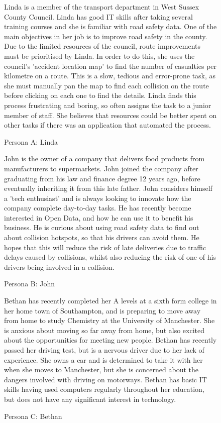 \documentclass[authoryearcitations]{UoYCSproject}
\begin{document}
\begin{figure}
	\begin{framed}
 		Linda is a member of the transport department in West Sussex County Council. Linda has good IT skills after taking several training courses and she is familiar with road safety data. One of the main objectives in her job is to improve road safety in the county. Due to the limited resources of the council, route improvements must be prioritised by Linda. In order to do this, she uses the council's 'accident location map' to find the number of casualties per kilometre on a route. This is a slow, tedious and error-prone task, as she must manually pan the map to find each collision on the route before clicking on each one to find the details. Linda finds this process frustrating and boring, so often assigns the task to a junior member of staff. She believes that resources could be better spent on other tasks if there was an application that automated the process.
  	\end{framed}
  \caption{Persona A: Linda}
  \label{fig:personaA}
\end{figure}

\begin{figure}
	\begin{framed}
 		John is the owner of a company that delivers food products from manufacturers to supermarkets. John joined the company after graduating from his law and finance degree 12 years ago, before eventually inheriting it from this late father. John considers himself a 'tech enthusiast' and is always looking to innovate how the company complete day-to-day tasks. He has recently become interested in Open Data, and how he can use it to benefit his business. He is curious about using road safety data to find out about collision hotspots, so that his drivers can avoid them. He hopes that this will reduce the risk of late deliveries due to traffic delays caused by collisions, whilst also reducing the risk of one of his drivers being involved in a collision. 	\end{framed}
  \caption{Persona B: John}
  \label{fig:personaB}
\end{figure}

\begin{figure}
	\begin{framed}
 		Bethan has recently completed her A levels at a sixth form college in her home town of Southampton, and is preparing to move away from home to study Chemistry at the University of Manchester. She is anxious about moving so far away from home, but also excited about the opportunities for meeting new people. Bethan has recently passed her driving test, but is a nervous driver due to her lack of experience. She owns a car and is determined to take it with her when she moves to Manchester, but she is concerned about the dangers involved with driving on motorways. Bethan has basic IT skills having used computers regularly throughout her education, but does not have any significant interest in technology.		
 	\end{framed}
  \caption{Persona C: Bethan}
  \label{fig:personaC}
\end{figure}
\end{document}
